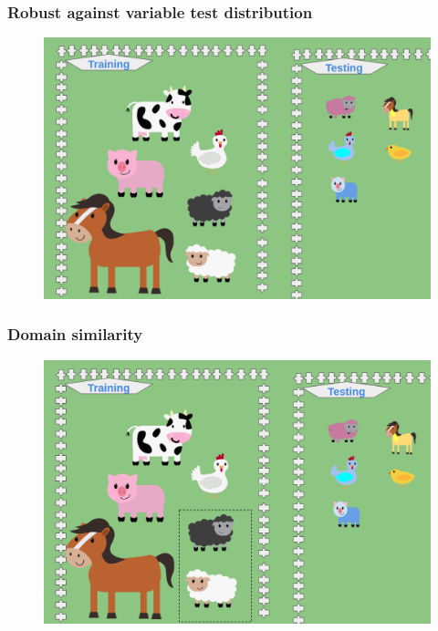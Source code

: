 \documentclass{beamer}
\begin{document}
\begin{frame}
\frametitle{Robust against variable test distribution}
\begin{figure}
\includegraphics[width=\textwidth]{test_question.png}
\end{figure}
\end{frame}

\begin{frame}
\frametitle{Domain similarity}
\begin{figure}
\includegraphics[width=\textwidth]{split_question.png}
\end{figure}
\end{frame}
\end{document}
